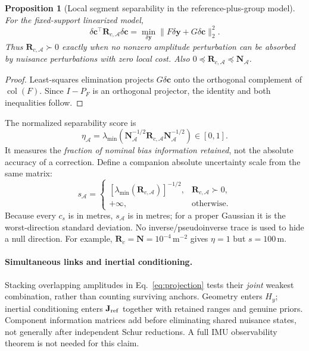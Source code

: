 \documentclass[conference]{IEEEtran}%
\newtheorem{proposition}{Proposition}
\newcommand{\A}{\mathcal A}
\newcommand{\N}{\mathbf N}
\newcommand{\Rc}{\mathbf R}
\begin{document}
\begin{proposition}[Local segment separability in the reference-plus-group model]
\label{prop:separability}
For the fixed-support linearized model,
\begin{equation}
 \delta\mathbf c^\top\Rc_{c,\A}\delta\mathbf c
 =\min_{\delta\mathbf y}\|F\delta\mathbf y+G\delta\mathbf c\|_2^2.
 \label{eq:profile}
\end{equation}
Thus $\Rc_{c,\A}\succ0$ exactly when no nonzero amplitude perturbation can be absorbed by nuisance perturbations with zero local cost. Also $0\preceq\Rc_{c,\A}\preceq\N_\A$.
\end{proposition}
\begin{proof}
Least-squares elimination projects $G\delta\mathbf c$ onto the orthogonal complement of $\operatorname{col}(F)$. Since $I-P_F$ is an orthogonal projector, the identity and both inequalities follow.
\end{proof}

The normalized separability score is
\begin{equation}
 \eta_\A=\lambda_{\min}
 (\N_\A^{-1/2}\Rc_{c,\A}\N_\A^{-1/2})\in[0,1].
 \label{eq:eta}
\end{equation}
It measures the \emph{fraction of nominal bias information retained}, not the absolute accuracy of a correction. Define a companion absolute uncertainty scale from the same matrix:
\begin{equation}
 s_\A=\begin{cases}
  [\lambda_{\min}(\Rc_{c,\A})]^{-1/2},&\Rc_{c,\A}\succ0,\\
  +\infty,&\text{otherwise}.
 \end{cases}
 \label{eq:sigma}
\end{equation}
Because every $c_s$ is in metres, $s_\A$ is in metres; for a proper Gaussian it is the worst-direction standard deviation. No inverse/pseudoinverse trace is used to hide a null direction. For example, $\Rc_c=\N=10^{-4}\,\mathrm{m}^{-2}$ gives $\eta=1$ but $s=100\,\mathrm m$.

\paragraph{Simultaneous links and inertial conditioning.}
Stacking overlapping amplitudes in Eq.~\eqref{eq:projection} tests their \emph{joint} weakest combination, rather than counting surviving anchors. Geometry enters $H_y$; inertial conditioning enters $\mathbf J_{\rm ref}$ together with retained ranges and genuine priors. Component information matrices add before eliminating shared nuisance states, not generally after independent Schur reductions. A full IMU observability theorem is not needed for this claim.
\end{document}
